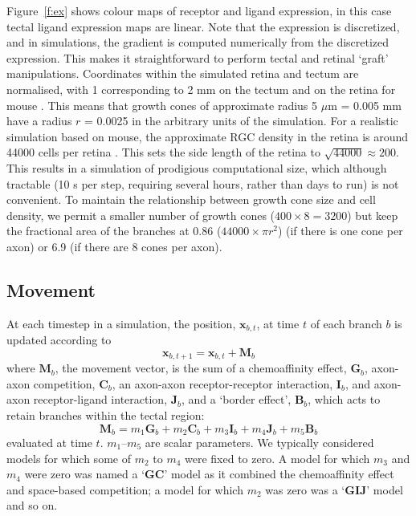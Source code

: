 \documentclass[11pt, a4paper]{article}
\begin{document}
Figure~\ref{f:ex} shows colour maps of receptor and ligand expression, in this
case tectal ligand expression maps are linear. Note that the expression is
discretized, and in simulations, the gradient is computed numerically from the
discretized expression. This makes it straightforward to perform tectal and
retinal `graft' manipulations. Coordinates within the simulated retina and
tectum are normalised, with 1 corresponding to 2 mm on the tectum and on the
retina for mouse \citep{reber_relative_2004}. This means that growth cones of
approximate radius 5 $\mu$m = 0.005 mm \citep{goodhill_can_2016} have a
radius $r$ = 0.0025 in the arbitrary units of the simulation. For a realistic
simulation based on mouse, the approximate RGC density in the retina is around
44000 cells per retina \citep{jeon_major_1998}. This sets the side length of
the retina to $\sqrt{44000} \approx 200$. This results in a simulation of
prodigious computational size, which although tractable (10 s per step,
requiring several hours, rather than days to run) is not convenient. To
maintain the relationship between growth cone size and cell density, we permit
a smaller number of growth cones ($400\times8=3200$) but keep the fractional
area of the branches at 0.86 ($44000 \times \pi r^2$) (if there is one cone
per axon) or 6.9 (if there are 8 cones per axon).

\subsection*{Movement}

At each timestep in a simulation, the position, $\mathbf{x}_{b,t}$, at time
$t$ of each branch $b$ is updated according to
%
\begin{equation}
\mathbf{x}_{b,t+1} = \mathbf{x}_{b,t} + \mathbf{M}_{b}
\end{equation}
%
where $\mathbf{M}_{b}$, the movement vector, is the sum of a chemoaffinity
effect, $\mathbf{G}_b$, axon-axon competition, $\mathbf{C}_b$, an axon-axon
receptor-receptor interaction, $\mathbf{I}_b$, and axon-axon receptor-ligand
interaction, $\mathbf{J}_b$, and a `border effect',
$\mathbf{B}_b$, which acts to retain branches within the tectal region:
%
\begin{equation}
\mathbf{M}_{b} = m_1 \mathbf{G}_b + m_2 \mathbf{C}_b + m_3 \mathbf{I}_b +
m_4 \mathbf{J}_b + m_5 \mathbf{B}_b
\end{equation}
%
evaluated at time $t$. $m_1$--$m_5$ are scalar parameters. We typically
considered models for which some of $m_2$ to $m_4$ were fixed to zero. A model
for which $m_3$ and $m_4$ were zero was named a `$\mathbf{GC}$' model as it
combined the chemoaffinity effect and space-based competition; a model for
which $m_2$ was zero was a `$\mathbf{GIJ}$' model and so on.
\end{document}
